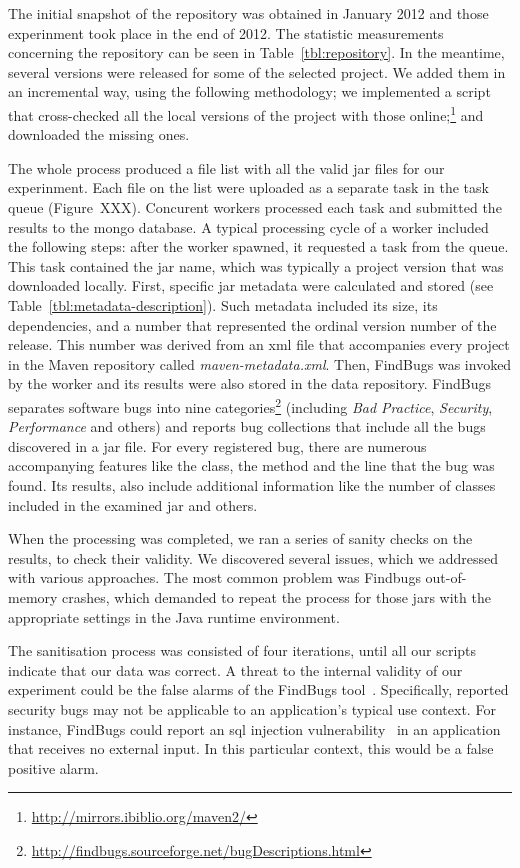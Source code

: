 \documentclass{sig-alternate}
\begin{document}
The initial snapshot of the repository was obtained in January 2012 and those experinment took
place in the end of 2012. The statistic measurements concerning the repository can be seen in 
Table~\ref{tbl:repository}. In the meantime, several versions were released for some of the selected project.
We added them in an incremental way, using the following methodology; we implemented a script that cross-checked 
all the local versions of the project with those online;\footnote{\url{http://mirrors.ibiblio.org/maven2/}} and downloaded
the missing ones.

The whole process produced a file list with all the valid {\sc jar} files for our experinment. Each file on the list were uploaded as a separate task in the task queue (Figure~XXX). Concurent workers processed each task and submitted the results to the mongo database. A typical processing cycle of a worker included the following steps: after
the worker spawned, it requested a task from the queue. This task contained
the {\sc jar} name, which was typically a project version that was downloaded locally. First, specific {\sc jar} metadata were calculated and stored (see Table~\ref{tbl:metadata-description}). Such metadata included its size, its dependencies, and a number that represented the ordinal version number
of the release. This number was derived from an {\sc xml} file that
accompanies every project in the Maven repository called {\it maven-metadata.xml}. Then, FindBugs was invoked by the worker and its results were also stored in the data repository. 
FindBugs separates software bugs into nine categories\footnote{\url{http://findbugs.sourceforge.net/bugDescriptions.html}} (including {\it Bad Practice}, {\it Security}, {\it Performance} and others) and reports bug collections that include all the bugs discovered in a {\sc jar} file. For every registered bug, there are numerous accompanying features like the class, the method and the line that the bug was found. Its results, also include additional information like the number of classes included in the examined {\sc jar} and others.

When the processing was completed, we ran a series of sanity checks on the results, to check their validity. We discovered several issues, which we addressed with various approaches. The most common problem was Findbugs out-of-memory crashes, which demanded to repeat the process for those {\sc jar}s with the appropriate settings in the Java runtime environment.

The sanitisation process was consisted of four iterations, until all our scripts indicate that our data was correct. A threat to the internal
validity of our experiment could be the false
alarms of the FindBugs tool~\cite{AP10, HP04}.
Specifically, reported security bugs may not
be applicable to an application's typical use context.
For instance, FindBugs could report an {\sc sql}
injection vulnerability~\cite{RL12}
in an application that receives no external input.
In this particular context, this would be a false
positive alarm.
\end{document}
